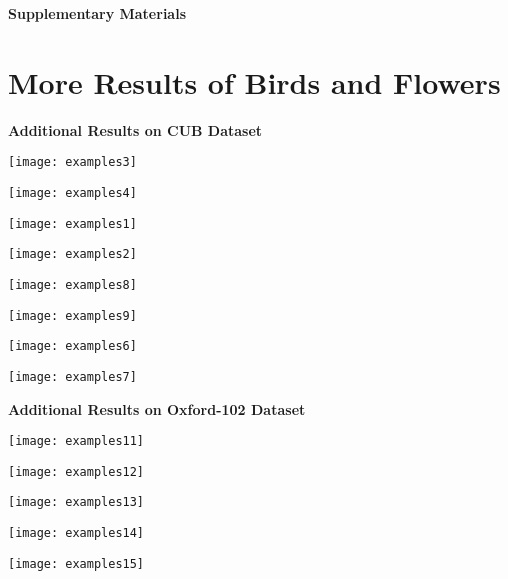 \documentclass[10pt,twocolumn,letterpaper]{article}
\begin{document}
{\small


}


\clearpage
\onecolumn
\centerline{\Large \bf Supplementary Materials}
\section*{More Results of Birds and Flowers}
\textbf{Additional Results on CUB Dataset}
\vspace{+5pt}


\texttt{[image: examples3]}
\vspace{+5pt}

\texttt{[image: examples4]}
\vspace{+5pt}

\texttt{[image: examples1]}
\vspace{+5pt}

\texttt{[image: examples2]}
\vspace{+5pt}



\texttt{[image: examples8]}
\vspace{+5pt}

\texttt{[image: examples9]}
\vspace{+5pt}



\texttt{[image: examples6]}
\vspace{+5pt}

\texttt{[image: examples7]}







\clearpage
\textbf{Additional Results on Oxford-102 Dataset}
\vspace{+5pt}

\texttt{[image: examples11]}
\vspace{+5pt}

\texttt{[image: examples12]}
\vspace{+5pt}

\texttt{[image: examples13]}
\vspace{+5pt}

\texttt{[image: examples14]}
\vspace{+5pt}

\texttt{[image: examples15]}
\end{document}
